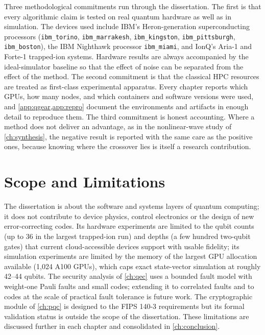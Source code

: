 Three methodological commitments run through the dissertation. The first is that every algorithmic claim is tested on real quantum hardware as well as in simulation. The devices used include IBM's Heron-generation superconducting processors (\texttt{ibm\_torino}, \texttt{ibm\_marrakesh}, \texttt{ibm\_kingston}, \texttt{ibm\_pittsburgh}, \texttt{ibm\_boston}), the IBM Nighthawk processor \texttt{ibm\_miami}, and IonQ's Aria-1 and Forte-1 trapped-ion systems. Hardware results are always accompanied by the ideal-simulator baseline so that the effect of noise can be separated from the effect of the method. The second commitment is that the classical HPC resources are treated as first-class experimental apparatus. Every chapter reports which GPUs, how many nodes, and which containers and software versions were used, and \cref{app:qgear,app:repro} document the environments and artifacts in enough detail to reproduce them. The third commitment is honest accounting. Where a method does not deliver an advantage, as in the nonlinear-wave study of \cref{ch:synthesis}, the negative result is reported with the same care as the positive ones, because knowing where the crossover lies is itself a research contribution.

\section{Scope and Limitations}\label{sec:intro:scope}

The dissertation is about the software and systems layers of quantum computing; it does not contribute to device physics, control electronics or the design of new error-correcting codes. Its hardware experiments are limited to the qubit counts (up to 36 in the largest trapped-ion run) and depths (a few hundred two-qubit gates) that current cloud-accessible devices support with usable fidelity; its simulation experiments are limited by the memory of the largest GPU allocation available (1,024 A100 GPUs), which caps exact state-vector simulation at roughly 42--44 qubits. The security analysis of \cref{ch:qec} uses a bounded fault model with weight-one Pauli faults and small codes; extending it to correlated faults and to codes at the scale of practical fault tolerance is future work. The cryptographic module of \cref{ch:pqc} is designed to the FIPS 140-3 requirements but its formal validation status is outside the scope of the dissertation. These limitations are discussed further in each chapter and consolidated in \cref{ch:conclusion}.

